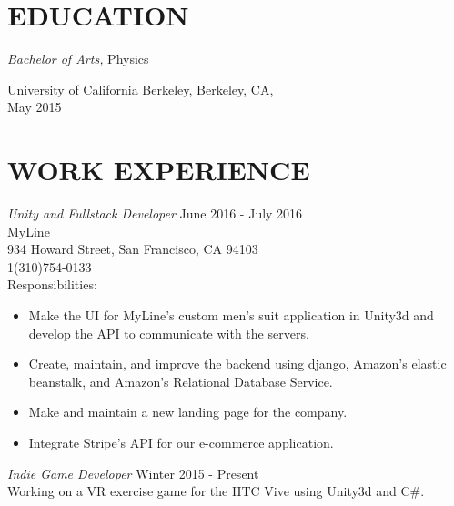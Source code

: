 \documentclass[line,margin]{res}
\begin{document}
\address{650 Mendocino Drive, Ukiah, CA 95482}
\address{GregMartinUCB@gmail.com (707)695-2062}

 
\begin{resume}


 
\section{EDUCATION} {\sl Bachelor of Arts,} Physics
 
                University of California Berkeley, Berkeley, CA,\\ 
                May 2015 \\
         

\section{WORK EXPERIENCE}
{\sl Unity and Fullstack Developer} \hfill June 2016 - July 2016 \\
MyLine\\
934 Howard Street, San Francisco, CA 94103\\
1(310)754-0133\\
Responsibilities:
\begin{itemize} \itemsep -2pt 
\item Make the UI for MyLine's custom men's suit application in Unity3d and develop the API to communicate with the servers.

\item Create, maintain, and improve the backend using django, Amazon's elastic beanstalk, and Amazon's Relational Database Service. 

\item Make and maintain a new landing page for the company. 

\item Integrate Stripe's API for our e-commerce application.
\end{itemize}


{\sl Indie Game Developer} \hfill Winter 2015 - Present \\
Working on a VR exercise game for the HTC Vive using Unity3d and C\#.


\end{resume}
\end{document}
